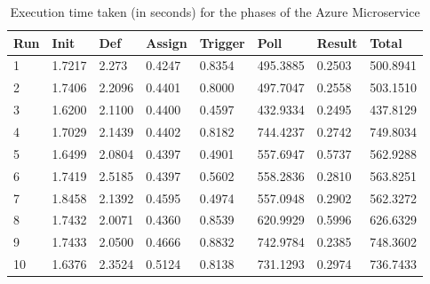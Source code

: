 \begin{table}[htb]
\begin{tabular}{|l|l|l|l|l|l|l|l|}
\hline
\textbf{Run} & \textbf{Init} & \textbf{Def} & \textbf{Assign} & \textbf{Trigger} & \textbf{Poll} & \textbf{Result} & \textbf{Total} \\ \hline
1            & 1.7217        & 2.273        & 0.4247          & 0.8354           & 495.3885      & 0.2503          & 500.8941       \\ \hline
2            & 1.7406        & 2.2096       & 0.4401          & 0.8000           & 497.7047      & 0.2558          & 503.1510       \\ \hline
3            & 1.6200        & 2.1100       & 0.4400          & 0.4597           & 432.9334      & 0.2495          & 437.8129       \\ \hline
4            & 1.7029        & 2.1439       & 0.4402          & 0.8182           & 744.4237      & 0.2742          & 749.8034       \\ \hline
5            & 1.6499        & 2.0804       & 0.4397          & 0.4901           & 557.6947      & 0.5737          & 562.9288       \\ \hline
6            & 1.7419        & 2.5185       & 0.4397          & 0.5602           & 558.2836      & 0.2810          & 563.8251       \\ \hline
7            & 1.8458        & 2.1392       & 0.4595          & 0.4974           & 557.0948      & 0.2902          & 562.3272       \\ \hline
8            & 1.7432        & 2.0071       & 0.4360          & 0.8539           & 620.9929      & 0.5996          & 626.6329       \\ \hline
9            & 1.7433        & 2.0500       & 0.4666          & 0.8832           & 742.9784      & 0.2385          & 748.3602       \\ \hline
10           & 1.6376        & 2.3524       & 0.5124          & 0.8138           & 731.1293      & 0.2974          & 736.7433       \\ \hline
\end{tabular}
\caption{Execution time taken (in seconds) for the phases of the Azure Microservice}
\end{table}

\newpage

